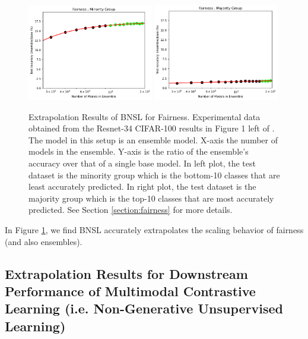 \documentclass{article} %
\begin{document}
\begin{figure}[htbp]
    \centering
\includegraphics[width=0.49\textwidth]{figures/fairness/minority.png}
\includegraphics[width=0.49\textwidth]{figures/fairness/majority.png}
    \caption{
Extrapolation Results of BNSL for Fairness. Experimental data obtained from the Resnet-34 CIFAR-100 results in Figure 1 left of \cite{ko2023fair}. The model in this setup is an ensemble model. X-axis the number of models in the ensemble. Y-axis is the ratio of the ensemble's accuracy over that of a single base model. In left plot, the test dataset is the minority group which is the bottom-10 classes that are least accurately predicted. In right plot, the test dataset is the majority group which is the top-10 classes that are most accurately predicted. See Section \ref{section:fairness} for more details.
    }
    \label{fig:fairness}
\end{figure}

In Figure \ref{fig:fairness}, we find BNSL accurately extrapolates the scaling behavior of fairness (and also ensembles).

\clearpage

\subsection{Extrapolation Results for Downstream Performance of Multimodal Contrastive Learning (i.e. Non-Generative Unsupervised Learning)}
\label{section:extrapolate_contrastive}
\end{document}
